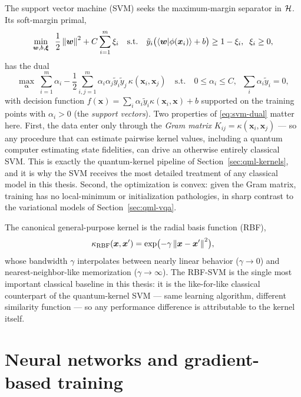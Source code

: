 The support vector machine (SVM) \citep{cortes1995svm} seeks the
maximum-margin separator in $\mathcal{H}$. Its soft-margin primal,
\begin{equation}
  \min_{\bm{w}, b, \bm{\xi}} \;\; \frac{1}{2} \left\lVert\bm{w}\right\rVert^2
    + C \sum_{i=1}^{m} \xi_i
  \quad \text{s.t.} \quad
  \tilde{y}_i \bigl( \left\langle\bm{w}\middle|\phi(\bm{x}_i)\right\rangle + b \bigr) \ge 1 - \xi_i,
  \;\; \xi_i \ge 0,
\end{equation}
has the dual
\begin{equation}
  \max_{\bm{\alpha}} \; \sum_{i=1}^{m} \alpha_i
    - \frac{1}{2} \sum_{i,j=1}^{m} \alpha_i \alpha_j \tilde{y}_i \tilde{y}_j\,
      \kappa(\bm{x}_i, \bm{x}_j)
  \quad \text{s.t.} \quad
  0 \le \alpha_i \le C, \;\; \textstyle\sum_i \alpha_i \tilde{y}_i = 0,
  \label{eq:svm-dual}
\end{equation}
with decision function
$f(\bm{x}) = \sum_i \alpha_i \tilde{y}_i \kappa(\bm{x}_i, \bm{x}) + b$
supported on the training points with $\alpha_i > 0$ (the \emph{support
vectors}). Two properties of \eqref{eq:svm-dual} matter here. First, the data
enter only through the \emph{Gram matrix}
$K_{ij} = \kappa(\bm{x}_i, \bm{x}_j)$ --- so any procedure that can estimate
pairwise kernel values, including a quantum computer estimating state
fidelities, can drive an otherwise entirely classical SVM. This is exactly the
quantum-kernel pipeline of Section~\ref{sec:qml-kernels}, and it is why the
SVM receives the most detailed treatment of any classical model in this
thesis. Second, the optimization is convex: given the Gram matrix, training
has no local-minimum or initialization pathologies, in sharp contrast to the
variational models of Section~\ref{sec:qml-vqa}.

The canonical general-purpose kernel is the radial basis function (RBF),
\begin{equation}
  \kappa_{\mathrm{RBF}}(\bm{x}, \bm{x}')
    = \exp\bigl( -\gamma \left\lVert\bm{x} - \bm{x}'\right\rVert^2 \bigr),
  \label{eq:rbf}
\end{equation}
whose bandwidth $\gamma$ interpolates between nearly linear behavior
($\gamma \to 0$) and nearest-neighbor-like memorization ($\gamma \to \infty$).
The RBF-SVM is the single most important classical baseline in this thesis:
it is the like-for-like classical counterpart of the quantum-kernel SVM ---
same learning algorithm, different similarity function --- so any performance
difference is attributable to the kernel itself.

\section{Neural networks and gradient-based training}
\label{sec:ml-nn}

